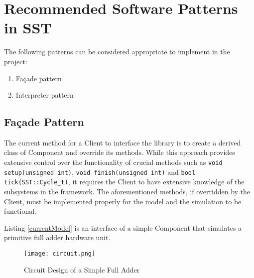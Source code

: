 \section{Recommended Software Patterns in SST}
The following patterns can be considered appropriate to implement in the project:
\begin{enumerate}
  \item Façade pattern
  \item Interpreter pattern
\end{enumerate}

\subsection{Façade Pattern}
The current method for a Client to interface the library is to create a derived class of Component and override its methods. While this approach provides extensive control over the functionality of crucial methods such as \texttt{void setup(unsigned int)}, \texttt{void finish(unsigned int)} and \texttt{bool tick(SST::Cycle\_t)}, it requires the Client to have extensive knowledge of the subsystems in the framework. The aforementioned methods, if overridden by the Client, must be implemented properly for the model and the simulation to be functional.

Listing \ref{currentModel} is an interface of a simple Component that simulates a primitive full adder hardware unit.

\begin{figure}[h]
  \caption{Circuit Design of a Simple Full Adder}
  \centering
  \texttt{[image: circuit.png]}
\end{figure}

